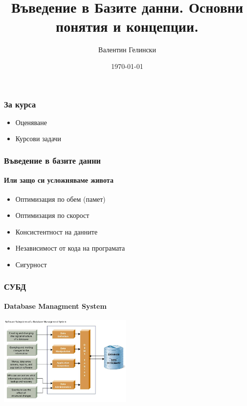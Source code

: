 \documentclass{beamer}
\title{Въведение в Базите данни. Основни понятия и концепции.}
\author{Валентин Гелински}
\institute{ТУ София}
\date{\today}
\begin{document}
  \begin{frame} 
    \titlepage
  \end{frame}

  \begin{frame}
    \frametitle{За курса}
    \begin{itemize}
      \item{Оценяване}
      \item{Курсови задачи}
    \end{itemize}
  \end{frame}

  \begin{frame}
    \frametitle{Въведение в базите данни}
    \framesubtitle{Или защо си усложняваме живота}
    \begin{itemize}
      \item{Оптимизация по обем (памет)}
      \item{Оптимизация по скорост}
      \item{Консистентност на данните}
      \item{Независимост от кода на програмата}
      \item{Сигурност}
    \end{itemize}
  \end{frame}

  \begin{frame}
    \frametitle{СУБД}
    \framesubtitle{Database Managment System}
    \includegraphics[width=250px]{img/rdbms}
  \end{frame}
\end{document}
